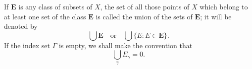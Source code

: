 If $\mathbf{E}$ is any class of subsets of $X$, the set of all those points of $X$ which belong to at least one set of the class $\mathbf{E}$ is called the union of the sets of $\mathbf{E}$; it will be denoted by
$$\bigcup \mathbf{E} \quad \text{or} \quad \bigcup \{E : E \in \mathbf{E}\}.$$
If the index set $\Gamma$ is empty, we shall make the convention that
$$\bigcup_{\gamma} E_\gamma = 0.$$

